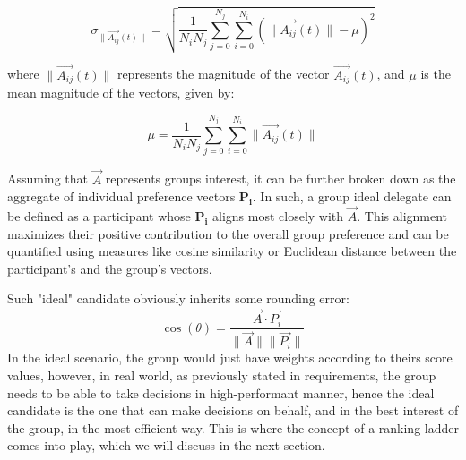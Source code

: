 \documentclass{article}
\begin{document}
\begin{CJK}{UTF8}{gbsn}
\begin{multicols}{2}
        \begin{equation}
            \sigma_{\|\vec{A_{ij}}(t)\|} = \sqrt{\frac{1}{N_{i}N_{j}} \sum_{j=0}^{N_{j}} \sum_{i=0}^{N_{i}} \left( \|\vec{A_{ij}}(t)\| - \mu \right)^2}
        \end{equation}

        where $\|\vec{A_{ij}}(t)\|$ represents the magnitude of the vector $\vec{A_{ij}}(t)$, and $\mu$ is the mean magnitude of the vectors, given by:

        \begin{equation}
            \mu = \frac{1}{N_{i}N_{j}} \sum_{j=0}^{N_{j}} \sum_{i=0}^{N_{i}} \|\vec{A_{ij}}(t)\|
        \end{equation}

        Assuming that $\vec{A}$ represents groups interest, it can be further broken down as the aggregate of individual preference vectors $\mathbf{P_i}$. In such, a group ideal delegate can be defined as a participant whose $\mathbf{P_i}$ aligns most closely with $\vec{A}$.
        This alignment maximizes their positive contribution to the overall group preference and can be quantified using measures like cosine similarity or Euclidean distance between the participant's and the group's vectors.

        Such "ideal" candidate obviously inherits some rounding error:
        \begin{equation}
            \label{eq:cosine-similarity}
            \cos(\theta) = \frac{\vec{A} \cdot \vec{P_i}}{\|\vec{A}\| \|\vec{P_i}\|}
        \end{equation}
        In the ideal scenario, the group would just have weights according to theirs score values, however, in real world, as previously stated in requirements, the group needs to be able to take decisions in high-performant manner, hence the ideal candidate is the one that can make decisions on behalf, and in the best interest of the group, in the most efficient way. This is where the concept of a ranking ladder comes into play, which we will discuss in the next section.


\end{multicols}
\end{CJK}
\end{document}
